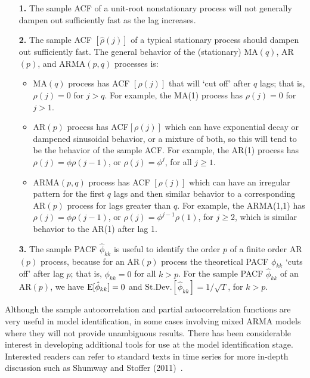 \begin{enumerate}
\item[\textbf{1.}] The sample ACF of a unit-root nonstationary process will not generally dampen out sufficiently fast as the lag increases.

\item[\textbf{2.}] The sample ACF $[\hat{\rho}(j)]$ of a typical stationary process should dampen out sufficiently fast. The general behavior of the (stationary) MA$(q)$, AR$(p)$, and ARMA$(p,q)$ processes is: 

\begin{itemize}
\item MA$(q)$ process has ACF $[\rho(j)]$ that will `cut off' after $q$ lags; that is, $\rho(j) = 0$ for $j > q$. For example, the MA(1) process has $\rho(j)= 0$ for $j > 1$.

\item AR$(p)$ process has ACF$[\rho(j)]$ which can have exponential decay or dampened sinusoidal behavior, or a mixture of both, so this will tend to be the behavior of the sample ACF. For example, the AR(1) process has $\rho(j)=\phi \rho(j-1)$,  or $\rho(j) = \phi^j$, for all $j \geq 1$.

\item ARMA$(p,q)$ process has ACF $[\rho(j)]$ which can have an irregular pattern for the first $q$ lags and then similar behavior to a corresponding AR$(p)$ process for lags greater than $q$. For example, the ARMA(1,1) has $\rho(j) = \phi \rho(j-1)$, or $\rho(j)= \phi^{j-1} \rho(1)$, for $j \geq 2$, which is similar behavior to the AR(1) after lag 1.
\end{itemize}

\item[\textbf{3.}] The sample PACF $\hat{\phi}_{kk}$ is useful to identify the order $p$ of a finite order AR$(p)$ process, because for an AR$(p)$ process the theoretical PACF $\phi_{kk}$ `cuts off' after lag $p$; that is, $\phi_{kk}= 0$ for all $k>p$. For the sample PACF $\hat{\phi}_{kk}$ of an AR$(p)$, we have $\operatorname{E}[\hat{\phi}_{kk}]= 0$ and $\text{St.Dev.}[\hat{\phi}_{kk}]=1 / \sqrt{T}$, for $k > p$. 
\end{enumerate} \twomedskip


Although the sample autocorrelation and partial autocorrelation functions are very useful in model identification, in some cases involving mixed ARMA models where they will not provide unambiguous results. There has been considerable interest in developing additional tools for use at the model identification stage. Interested readers can refer to standard texts in time series for more in-depth discussion such as Shumway and Stoffer (2011)~\cite{shumway2011arima}. \twomedskip

